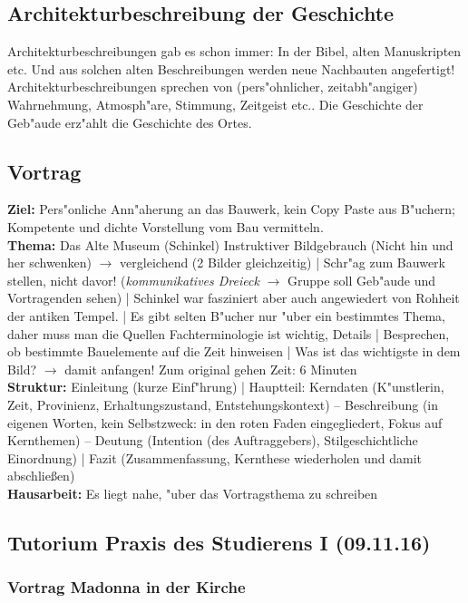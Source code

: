 \documentclass[]{scrartcl}
\begin{document}
\subsection{Architekturbeschreibung der Geschichte}

Architekturbeschreibungen gab es schon immer: In der Bibel, alten Manuskripten etc. Und aus solchen alten Beschreibungen werden neue Nachbauten angefertigt!
Architekturbeschreibungen sprechen von (pers"ohnlicher, zeitabh"angiger) Wahrnehmung, Atmosph"are, Stimmung, Zeitgeist etc.. Die Geschichte der Geb"aude erz"ahlt die Geschichte des Ortes.



\subsection{Vortrag}

\textbf{Ziel:} Pers"onliche Ann"aherung an das Bauwerk, kein Copy Paste aus B"uchern; 
Kompetente und dichte Vorstellung vom Bau vermitteln. \\
\textbf{Thema:} Das Alte Museum (Schinkel)
Instruktiver Bildgebrauch (Nicht hin und her schwenken) $\rightarrow$ vergleichend (2 Bilder gleichzeitig) |
Schr"ag zum Bauwerk stellen, nicht davor! (\emph{kommunikatives Dreieck} $\rightarrow$ Gruppe soll Geb"aude und Vortragenden sehen) | 
Schinkel war fasziniert aber auch angewiedert von Rohheit der antiken Tempel. |
Es gibt selten B"ucher nur "uber ein bestimmtes Thema, daher muss man die Quellen 
Fachterminologie ist wichtig, Details | Besprechen, ob bestimmte Bauelemente auf die Zeit hinweisen | Was ist das wichtigste in dem Bild? $\rightarrow$ damit anfangen!
Zum original gehen
Zeit: 6 Minuten\\
\textbf{Struktur:} Einleitung (kurze Einf"hrung) | Hauptteil: Kerndaten (K"unstlerin, Zeit, Provinienz, Erhaltungszustand, Entstehungskontext) -- Beschreibung (in eigenen Worten, kein Selbstzweck: in den roten Faden eingegliedert, Fokus auf Kernthemen) -- Deutung (Intention (des Auftraggebers), Stilgeschichtliche Einordnung) | Fazit (Zusammenfassung, Kernthese wiederholen und damit abschlie\ss en)\\
\textbf{Hausarbeit:} Es liegt nahe, "uber das Vortragsthema zu schreiben

\subsection{Tutorium Praxis des Studierens I (09.11.16)}

\subsubsection{Vortrag Madonna in der Kirche}
\end{document}
